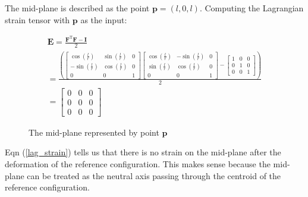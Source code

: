 \begin{problem}
    \noindent
    \normalfont

    The mid-plane is described as the point $\mathbf{p}=(l,0, l)$. Computing the Lagrangian strain tensor with $\mathbf{p}$ as the input:


\begin{align}
\mathbf{E}=\frac{\mathbf{F}^{\text{T}}\mathbf{F}-\mathbf{I}}{2} \\
= \frac{\left( \begin{bmatrix}
\cos\left( \frac{l}{r} \right) & \sin\left( \frac{l}{r} \right) & 0 \\
-\sin\left( \frac{l}{r} \right) & \cos\left( \frac{l}{r} \right) & 0 \\
0 & 0 & 1
\end{bmatrix}\begin{bmatrix}
\cos\left( \frac{l}{r} \right) & -\sin\left( \frac{l}{r} \right) & 0 \\
\sin\left( \frac{l}{r} \right) & \cos\left( \frac{l}{r} \right) & 0 \\
0 & 0 & 1
\end{bmatrix}-\begin{bmatrix}
1 & 0 & 0 \\
0 & 1 & 0 \\
0 & 0 & 1
\end{bmatrix} \right)}{2} \\
=\begin{bmatrix}
0 & 0 & 0 \\
0 & 0 & 0 \\
0 & 0 & 0
\end{bmatrix} \label{lag_strain}
\end{align}
\begin{figure}[htbp]
    \centering
    \caption{The mid-plane represented by point $\mathbf{p}$}
    \label{fig:midplane}
\end{figure}
Eqn (\ref{lag_strain}) tells us that there is no strain on the mid-plane after the deformation of the reference configuration. This makes sense because the mid-plane can be treated as the neutral axis passing through the centroid of the reference configuration. 
\end{problem}